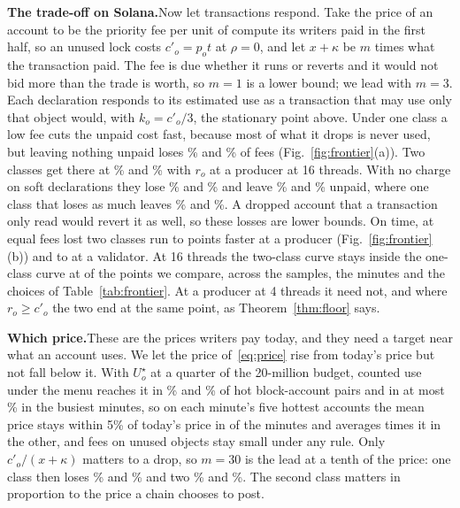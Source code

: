 \documentclass[conference,compsoc]{IEEEtran}
\numberwithin{equation}{section}
\theoremstyle{plain}
\theoremstyle{definition}
\theoremstyle{remark}
\newcommand{\runin}[1]{\par\smallskip\noindent\textbf{#1.}\enspace}
\newcommand{\cp}{c'}
\begin{document}
\runin{The trade-off on Solana}Now let transactions respond. Take the price of an account to be the priority fee per unit of compute its writers paid in the first half, so an unused lock costs $\cp_o = p_o t$ at $\rho = 0$, and let $x + \kappa$ be $m$ times what the transaction paid. The fee is due whether it runs or reverts and it would not bid more than the trade is worth, so $m = 1$ is a lower bound; we lead with $m = 3$. Each declaration responds to its estimated use as a transaction that may use only that object would, with $k_o = \cp_o/3$, the stationary point above. Under one class a low fee cuts the unpaid cost fast, because most of what it drops is never used, but leaving nothing unpaid loses \frOneLostA\% and \frOneLostB\% of fees (Fig.~\ref{fig:frontier}(a)). Two classes get there at \frTwoLostA\% and \frTwoLostB\% with $r_o$ at a producer at 16 threads. With no charge on soft declarations they lose \frLeftLostA\% and \frLeftLostB\% and leave \frLeftUnpaidA\% and \frLeftUnpaidB\% unpaid, where one class that loses as much leaves \frOneAtLeftA\% and \frOneAtLeftB\%. A dropped account that a transaction only read would revert it as well, so these losses are lower bounds. On time, at equal fees lost two classes run \frGapFreeMin{} to \frGapFreeMax{} points faster at a producer (Fig.~\ref{fig:frontier}(b)) and \frGapBlockMin{} to \frGapBlockMax{} at a validator. At 16 threads the two-class curve stays inside the one-class curve at \frPointsInside{} of the \frPoints{} points we compare, across the samples, the minutes and the choices of Table~\ref{tab:frontier}. At a producer at 4 threads it need not, and where $r_o \ge \cp_o$ the two end at the same point, as Theorem~\ref{thm:floor} says.

\runin{Which price}These are the prices writers pay today, and they need a target near what an account uses. We let the price of~\eqref{eq:price} rise from today's price but not fall below it. With $U^\star_o$ at a quarter of the 20-million budget, counted use under the menu reaches it in \useClassAtQuarterA\% and \useClassAtQuarterB\% of hot block-account pairs and in at most \winClassUseAtQuarterMax\% in the busiest minutes, so on each minute's five hottest accounts the mean price stays within 5\% of today's price in \nPathNear{} of the \nMinutes{} minutes and averages \winPathFreeQuarterMax{} times it in the other, and fees on unused objects stay small under any rule. Only $\cp_o/(x+\kappa)$ matters to a drop, so $m = 30$ is the lead at a tenth of the price: one class then loses \frTabMThirtyOneEndA\% and \frTabMThirtyOneEndB\% and two \frTabMThirtyTwoEndA\% and \frTabMThirtyTwoEndB\%. The second class matters in proportion to the price a chain chooses to post.
\end{document}
